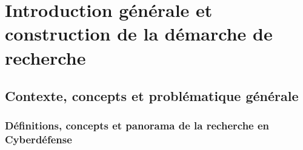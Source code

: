 \documentclass[ twoside,openright,titlepage,numbers=noenddot,headinclude,%
                footinclude=true,cleardoublepage=empty,abstractoff, %
                BCOR=5mm,paper=a4,fontsize=11pt,%
                french,american,%
                ]{scrreprt}
\begin{document}
\frenchspacing
\raggedbottom
{} %
\pagestyle{plain}




\cleardoublepage
\cleardoublepage

\cleardoublepage 
\pagestyle{scrheadings}
\cleardoublepage 

\cleardoublepage{}
\cleardoublepage


\part{Introduction générale et construction de la démarche de recherche}

\chapter{Contexte, concepts et problématique générale}

\section{Définitions, concepts et panorama de la recherche en Cyberdéfense}\label{sec:cyberdef-panorama}

\end{document}

